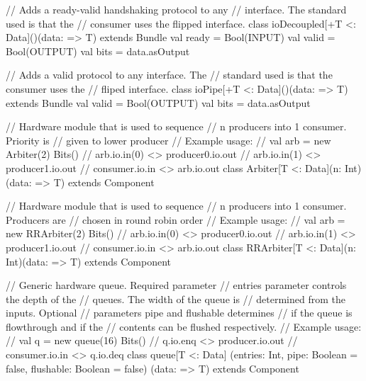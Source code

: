 \documentclass[10pt,twocolumn]{article}
\begin{document}
\begin{scala}
// Adds a ready-valid handshaking protocol to any 
// interface. The standard used is that the 
// consumer uses the flipped interface.
class ioDecoupled[+T <: Data]()(data: => T) 
    extends Bundle {
  val ready = Bool(INPUT)
  val valid = Bool(OUTPUT)
  val bits  = data.asOutput
}

// Adds a valid protocol to any interface. The
// standard used is that the consumer uses the
// fliped interface.
class ioPipe[+T <: Data]()(data: => T) 
    extends Bundle {
  val valid = Bool(OUTPUT)
  val bits = data.asOutput
}

// Hardware module that is used to sequence 
// n producers into 1 consumer. Priority is
// given to lower producer
// Example usage:
//    val arb = new Arbiter(2){ Bits() }
//    arb.io.in(0) <> producer0.io.out
//    arb.io.in(1) <> producer1.io.out
//    consumer.io.in <> arb.io.out
class Arbiter[T <: Data](n: Int)(data: => T) extends Component 

// Hardware module that is used to sequence 
// n producers into 1 consumer. Producers are
// chosen in round robin order
// Example usage:
//    val arb = new RRArbiter(2){ Bits() }
//    arb.io.in(0) <> producer0.io.out
//    arb.io.in(1) <> producer1.io.out
//    consumer.io.in <> arb.io.out
class RRArbiter[T <: Data](n: Int)(data: => T) extends Component 

// Generic hardware queue. Required parameter
// entries parameter controls the depth of the 
// queues. The width of the queue is 
// determined from the inputs. Optional
// parameters pipe and flushable determines
// if the queue is flowthrough and if the 
// contents can be flushed respectively.
// Example usage:
//    val q = new queue(16){ Bits() }
//    q.io.enq <> producer.io.out
//    consumer.io.in <> q.io.deq
class queue[T <: Data]
    (entries: Int, 
     pipe: Boolean = false, 
     flushable: Boolean = false)
    (data: => T) extends Component  
\end{scala}

\end{document}
